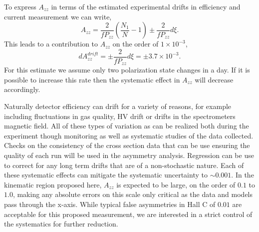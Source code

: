 To express $A_{zz}$ in terms of the estimated experimental drifts in efficiency and current measurement we can write,
\begin{equation}
A_{zz}=\frac{2}{fP_{zz}}\left(\frac{N_1}{N}-1\right)\pm\frac{2}{fP_{zz}}d\xi.
\end{equation}
This leads to a contribution to $A_{zz}$ on the order of $1\times10^{-3}$,
\begin{equation}
dA_{zz}^{drift}=\pm\frac{2}{fP_{zz}}d\xi=\pm3.7\times10^{-3}.
\end{equation}
For this estimate we assume only two polarization state changes in a
day. 
If it is possible to increase this rate then the systematic effect in $A_{zz}$ will decrease accordingly.

Naturally detector efficiency can drift for a variety of reasons, for
example including fluctuations in gas quality, HV drift or
drifts in the spectrometers magnetic field.  All of these types of variation as can be realized both
during the experiment though monitoring as well as systematic studies of the data collected.
Checks on the consistency of the cross section data that can be use ensuring the quality of each run will be used in the asymmetry analysis.  Regression can be use to correct for any long term drifts that are of a non-stochastic nature.
Each of these systematic effects can mitigate the systematic uncertainty to $\sim0.001$. 
In the kinematic region proposed here, $A_{zz}$ is expected to be large, on the order of $0.1$ to $1.0$, making any absolute errors on this scale only critical as the data and models pass through the x-axis.  While typical false asymmetries in Hall C of $0.01$ are acceptable for this proposed measurement, we are interested in a strict control of the systematics for further reduction.